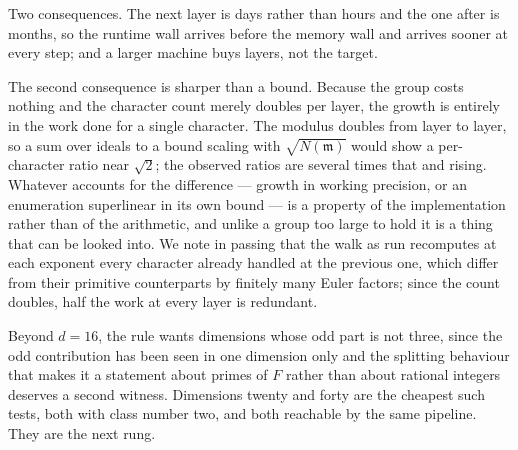 \documentclass[12pt,a4paper]{article}
\newcommand{\Fd}{F}
\begin{document}
Two consequences. The next layer is days rather than hours and the one after is
months, so the runtime wall arrives before the memory wall and arrives sooner at
every step; and a larger machine buys layers, not the target.

The second consequence is sharper than a bound. Because the group costs nothing
and the character count merely doubles per layer, the growth is entirely in the
work done for a single character. The modulus doubles from layer to layer, so a
sum over ideals to a bound scaling with $\sqrt{N(\mathfrak{m})}$ would show a
per-character ratio near $\sqrt 2$; the observed ratios are several times that
and rising. Whatever accounts for the difference — growth in working precision,
or an enumeration superlinear in its own bound — is a property of the
implementation rather than of the arithmetic, and unlike a group too large to
hold it is a thing that can be looked into. We note in passing that the walk as
run recomputes at each exponent every character already handled at the previous
one, which differ from their primitive counterparts by finitely many Euler
factors; since the count doubles, half the work at every layer is redundant.

Beyond $d=16$, the rule wants dimensions whose odd part is not three, since the odd contribution has been seen in one dimension only and the splitting behaviour that makes it a statement about primes of $\Fd$ rather than about rational integers deserves a second witness. Dimensions twenty and forty are the cheapest such tests, both with class number two, and both reachable by the same pipeline. They are the next rung.

\end{document}
